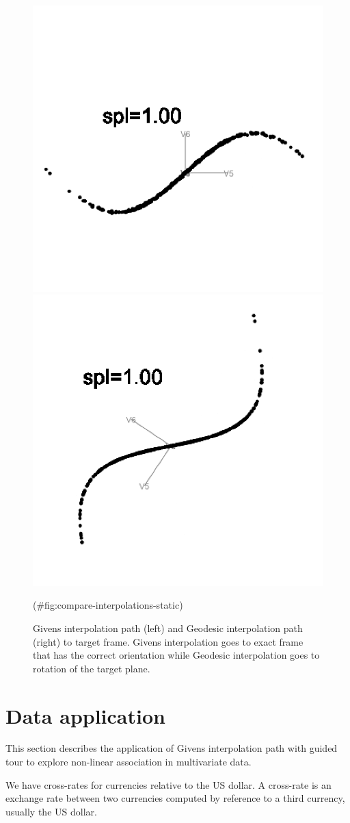 \begin{figure}

{\centering \includegraphics[width=0.5\linewidth]{given_sine} \includegraphics[width=0.5\linewidth]{geodesic_sine} 

}

\caption{Givens interpolation path (left) and Geodesic interpolation path (right) to target frame. Givens interpolation goes to exact frame that has the correct orientation while Geodesic interpolation goes to rotation of the target plane.}(\#fig:compare-interpolations-static)
\end{figure}

\hypertarget{data-application}{%
\section{Data application}\label{data-application}}

This section describes the application of Givens interpolation path with guided tour to explore non-linear association in multivariate data.

We have cross-rates for currencies relative to the US dollar. A cross-rate is an exchange rate between two currencies computed by reference to a third currency, usually the US dollar.

